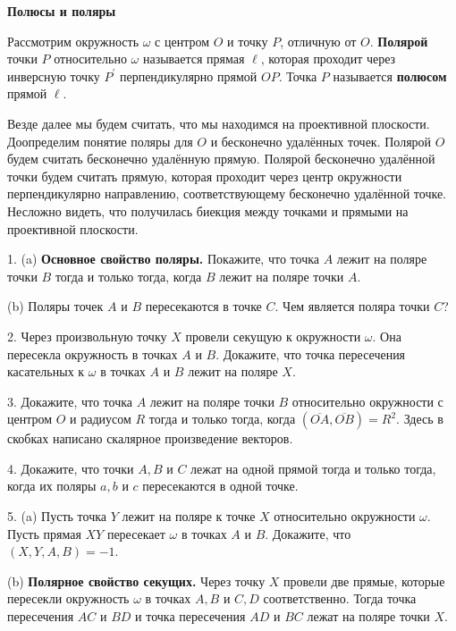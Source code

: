 \centerline{\bf \Huge Полюсы и поляры }

\begin{flushright}
        \scriptsize{}
\end{flushright}

Рассмотрим окружность $\omega$ с центром $O$ и точку $P$, отличную от $O$. \textbf{Полярой} точки $P$ относительно $\omega$ называется прямая $\ell$, которая проходит через инверсную точку $P^{\prime}$ перпендикулярно прямой $O P$. Точка $P$ называется \textbf{полюсом} прямой $\ell$.

Везде далее мы будем считать, что мы находимся на проективной плоскости. Доопределим понятие поляры для $O$ и бесконечно удалённых точек. Полярой $O$ будем считать бесконечно удалённую прямую. Полярой бесконечно удалённой точки будем считать прямую, которая проходит через центр окружности перпендикулярно направлению, соответствующему бесконечно удалённой точке. Несложно видеть, что получилась биекция между точками и прямыми на проективной плоскости.

1. (a) \textbf{Основное свойство поляры.} Покажите, что точка $A$ лежит на поляре точки $B$ тогда и только тогда, когда $B$ лежит на поляре точки $A$.

\quad(b) Поляры точек $A$ и $B$ пересекаются в точке $C$. Чем является поляра точки $C$?

2. Через произвольную точку $X$ провели секущую к окружности $\omega$. Она пересекла окружность в точках $A$ и $B$. Докажите, что точка пересечения касательных к $\omega$ в точках $A$ и $B$ лежит на поляре $X$.

3. Докажите, что точка $A$ лежит на поляре точки $B$ относительно окружности с центром $O$ и радиусом $R$ тогда и только тогда, когда $(\overline{O A}, \overline{O B})=R^2$. Здесь в скобках написано скалярное произведение векторов.

4. Докажите, что точки $A, B$ и $C$ лежат на одной прямой тогда и только тогда, когда их поляры $a, b$ и $c$ пересекаются в одной точке.

5. (a) Пусть точка $Y$ лежит на поляре к точке $X$ относительно окружности $\omega$. Пусть прямая $X Y$ пересекает $\omega$ в точках $A$ и $B$. Докажите, что $(X, Y, A, B)=-1$.

\quad(b) \textbf{Полярное свойство секущих.} Через точку $X$ провели две прямые, которые пересекли окружность $\omega$ в точках $A, B$ и $C, D$ соответственно. Тогда точка пересечения $A C$ и $B D$ и точка пересечения $A D$ и $B C$ лежат на поляре точки $X$.